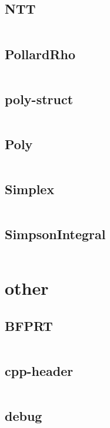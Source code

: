 \documentclass[a4]{article}
\begin{document}
\subsection{NTT}
\inputminted[mathescape,linenos,numbersep=5pt,frame=lines,framesep=2mm]{cpp}{src/math/NTT.cpp}
\subsection{PollardRho}
\inputminted[mathescape,linenos,numbersep=5pt,frame=lines,framesep=2mm]{cpp}{src/math/PollardRho.cpp}
\subsection{poly-struct}
\inputminted[mathescape,linenos,numbersep=5pt,frame=lines,framesep=2mm]{cpp}{src/math/poly-struct.cpp}
\subsection{Poly}
\inputminted[mathescape,linenos,numbersep=5pt,frame=lines,framesep=2mm]{cpp}{src/math/Poly.cpp}
\subsection{Simplex}
\inputminted[mathescape,linenos,numbersep=5pt,frame=lines,framesep=2mm]{cpp}{src/math/Simplex.cpp}
\subsection{SimpsonIntegral}
\inputminted[mathescape,linenos,numbersep=5pt,frame=lines,framesep=2mm]{cpp}{src/math/SimpsonIntegral.cpp}
\section{other}
\subsection{BFPRT}
\inputminted[mathescape,linenos,numbersep=5pt,frame=lines,framesep=2mm]{cpp}{src/other/BFPRT.cpp}
\subsection{cpp-header}
\inputminted[mathescape,linenos,numbersep=5pt,frame=lines,framesep=2mm]{cpp}{src/other/cpp-header.cpp}
\subsection{debug}
\inputminted[mathescape,linenos,numbersep=5pt,frame=lines,framesep=2mm]{h}{src/other/debug.h}
\end{document}
